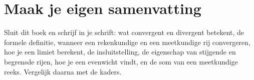 
\ifzelfstudie
\section*{Maak je eigen samenvatting}
Sluit dit boek en schrijf in je schrift: wat convergent en divergent betekent, de formele definitie, wanneer een rekenkundige en een meetkundige rij convergeren, hoe je een limiet berekent, de insluitstelling, de eigenschap van stijgende en begrensde rijen, hoe je een evenwicht vindt, en de som van een meetkundige reeks. Vergelijk daarna met de kaders.
\fi
